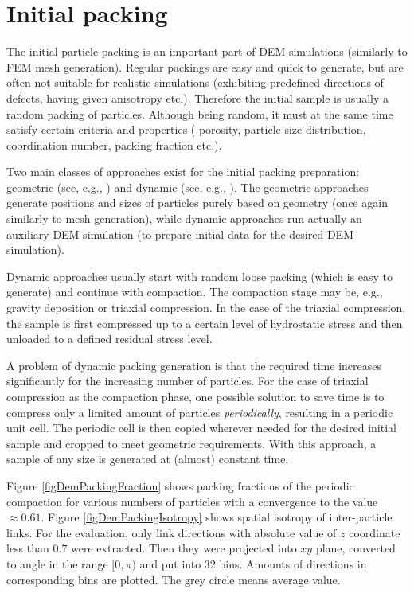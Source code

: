 \section{Initial packing}\label{secDEMInitialPacking}
The initial particle packing is an important part of DEM simulations (similarly to FEM mesh generation).
Regular packings are easy and quick to generate, but are often not suitable for realistic simulations (exhibiting predefined directions of defects, having given anisotropy etc.).
Therefore the initial sample is usually a random packing of particles.
Although being random, it must at the same time satisfy certain criteria and properties (%
porosity,
particle size distribution,
coordination number,
packing fraction
etc.).

Two main classes of approaches exist for the initial packing preparation: geometric (see, e.g., \cite{JerierRichefeuImbaultDonze2010a}) and dynamic (see, e.g., \cite{yade2015}).
The geometric approaches generate positions and sizes of particles purely based on geometry (once again similarly to mesh generation),
while dynamic approaches run actually an auxiliary DEM simulation (to prepare initial data for the desired DEM simulation).

Dynamic approaches usually start with random loose packing (which is easy to generate) and continue with compaction.
The compaction stage may be, e.g., gravity deposition or triaxial compression.
In the case of the triaxial compression, the sample is first compressed up to a certain level of hydrostatic stress and then unloaded to a defined residual stress level.

A problem of dynamic packing generation is that the required time increases significantly for the increasing number of particles.
For the case of triaxial compression as the compaction phase, one possible solution to save time is to compress only a limited amount of particles \emph{periodically}, resulting in a periodic unit cell.
The periodic cell is then copied wherever needed for the desired initial sample and cropped to meet geometric requirements.
With this approach, a sample of any size is generated at (almost) constant time.

Figure \ref{figDemPackingFraction} shows packing fractions of the periodic compaction for various numbers of particles with a convergence to the value $\approx0{.}61$.
Figure \ref{figDemPackingIsotropy} shows spatial isotropy of inter-particle links.
For the evaluation, only link directions with absolute value of $z$ coordinate less than $0{.}7$ were extracted.
Then they were projected into $xy$ plane, converted to angle in the range $[0,\pi)$ and put into $32$ bins.
Amounts of directions in corresponding bins are plotted.
The grey circle means average value.


